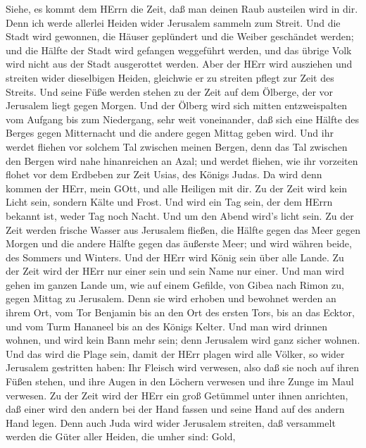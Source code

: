  Siehe, es kommt dem HErrn die Zeit, daß man deinen Raub
austeilen wird in dir.  Denn ich werde allerlei Heiden wider
Jerusalem sammeln zum Streit. Und die Stadt wird gewonnen, die Häuser
geplündert und die Weiber geschändet werden; und die Hälfte der Stadt
wird gefangen weggeführt werden, und das übrige Volk wird nicht aus der
Stadt ausgerottet werden.  Aber der HErr wird ausziehen und
streiten wider dieselbigen Heiden, gleichwie er zu streiten pflegt zur
Zeit des Streits.  Und seine Füße werden stehen zu der Zeit
auf dem Ölberge, der vor Jerusalem liegt gegen Morgen. Und der Ölberg
wird sich mitten entzweispalten vom Aufgang bis zum Niedergang, sehr
weit voneinander, daß sich eine Hälfte des Berges gegen Mitternacht und
die andere gegen Mittag geben wird.  Und ihr werdet fliehen
vor solchem Tal zwischen meinen Bergen, denn das Tal zwischen den Bergen
wird nahe hinanreichen an Azal; und werdet fliehen, wie ihr vorzeiten
flohet vor dem Erdbeben zur Zeit Usias, des Königs Judas. Da wird denn
kommen der HErr, mein GOtt, und alle Heiligen mit dir.  Zu
der Zeit wird kein Licht sein, sondern Kälte und Frost.  Und
wird ein Tag sein, der dem HErrn bekannt ist, weder Tag noch Nacht. Und
um den Abend wird's licht sein.  Zu der Zeit werden frische
Wasser aus Jerusalem fließen, die Hälfte gegen das Meer gegen Morgen und
die andere Hälfte gegen das äußerste Meer; und wird währen beide, des
Sommers und Winters.  Und der HErr wird König sein über alle
Lande. Zu der Zeit wird der HErr nur einer sein und sein Name nur einer.
 Und man wird gehen im ganzen Lande um, wie auf einem
Gefilde, von Gibea nach Rimon zu, gegen Mittag zu Jerusalem. Denn sie
wird erhoben und bewohnet werden an ihrem Ort, vom Tor Benjamin bis an
den Ort des ersten Tors, bis an das Ecktor, und vom Turm Hananeel bis an
des Königs Kelter.  Und man wird drinnen wohnen, und wird
kein Bann mehr sein; denn Jerusalem wird ganz sicher wohnen.
 Und das wird die Plage sein, damit der HErr plagen wird
alle Völker, so wider Jerusalem gestritten haben: Ihr Fleisch wird
verwesen, also daß sie noch auf ihren Füßen stehen, und ihre Augen in
den Löchern verwesen und ihre Zunge im Maul verwesen.  Zu
der Zeit wird der HErr ein groß Getümmel unter ihnen anrichten, daß
einer wird den andern bei der Hand fassen und seine Hand auf des andern
Hand legen.  Denn auch Juda wird wider Jerusalem streiten,
daß versammelt werden die Güter aller Heiden, die umher sind: Gold,
